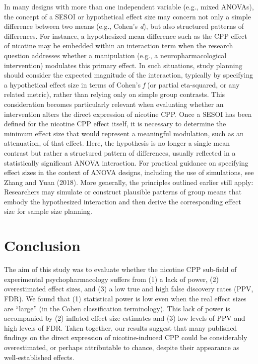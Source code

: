 \documentclass[authordate, meta]{jote-new-article}
\begin{document}
	In many designs with more than one independent variable (e.g., mixed ANOVAs), the concept of a SESOI or hypothetical effect size may concern not only a simple difference between two means (e.g., Cohen's \emph{d}), but also structured patterns of differences. For instance, a hypothesized mean difference such as the CPP effect of nicotine may be embedded within an interaction term when the research question addresses whether a manipulation (e.g., a neuropharmacological intervention) modulates this primary effect. In such situations, study planning should consider the expected magnitude of the interaction, typically by specifying a hypothetical effect size in terms of Cohen's \emph{f }(or partial eta-squared, or any related metric), rather than relying only on simple group contrasts. This consideration becomes particularly relevant when evaluating whether an intervention alters the direct expression of nicotine CPP. Once a SESOI has been defined for the nicotine CPP effect itself, it is necessary to determine the minimum effect size that would represent a meaningful modulation, such as an attenuation, of that effect. Here, the hypothesis is no longer a single mean contrast but rather a structured pattern of differences, usually reflected in a statistically significant ANOVA interaction. For practical guidance on specifying effect sizes in the context of ANOVA designs, including the use of simulations, see Zhang and Yuan (2018). More generally, the principles outlined earlier still apply: Researchers may simulate or construct plausible patterns of group means that embody the hypothesized interaction and then derive the corresponding effect size for sample size planning.



	\section{\textbf{Conclusion}}



	The aim of this study was to evaluate whether the nicotine CPP sub-field of experimental psychopharmacology suffers from (1) a lack of power, (2) overestimated effect sizes, and (3) a low true and high false discovery rates (PPV, FDR). We found that (1) statistical power is low even when the real effect sizes are “large” (in the Cohen classification terminology). This lack of power is accompanied by (2) inflated effect size estimates and (3) low levels of PPV and high levels of FDR. Taken together, our results suggest that many published findings on the direct expression of nicotine-induced CPP could be considerably overestimated, or perhaps attributable to chance, despite their appearance as well-established effects.
\end{document}
